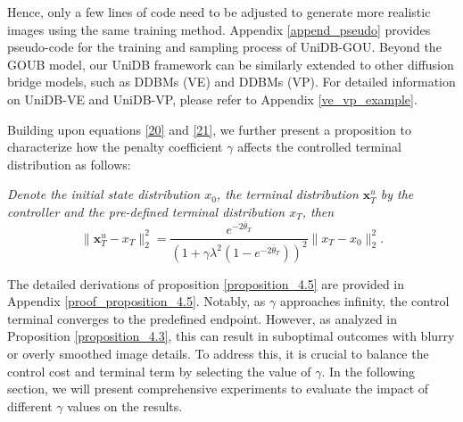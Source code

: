 Hence, only a few lines of code need to be adjusted to generate more realistic images using the same training method. Appendix \ref{append_pseudo} provides pseudo-code for the training and sampling process of UniDB-GOU. Beyond the GOUB model, our UniDB framework can be similarly extended to other diffusion bridge models, such as DDBMs (VE) and DDBMs (VP). For detailed information on UniDB-VE and UniDB-VP, please refer to Appendix \ref{ve_vp_example}. 

Building upon equations \eqref{20} and \eqref{21}, we further present a proposition to characterize how the penalty coefficient $\gamma$ affects the controlled terminal distribution as follows: 
\begin{proposition}\label{proposition_4.5}
\textit{Denote the initial state distribution $x_0$, the terminal distribution $\mathbf{x}_T^u$ by the controller and the pre-defined terminal distribution $x_T$, then}
\begin{equation}\label{terminal_distance}
    \| \mathbf{x}_T^u - x_T \|^2_2 = \frac{e^{-2\bar{\theta}_{T}}}{\left( 1 + \gamma \lambda^2 (1 - e^{-2\bar{\theta}_{T}}) \right)^2} \| x_T - x_0 \|^2_2.
\end{equation}
\end{proposition}


The detailed derivations of proposition \ref{proposition_4.5} are provided in Appendix \ref{proof_proposition_4.5}. Notably, as $\gamma$ approaches infinity, the control terminal converges to the predefined endpoint. However, as analyzed in Proposition \ref{proposition_4.3}, this can result in suboptimal outcomes with blurry or overly smoothed image details. To address this, it is crucial to balance the control cost and terminal term by selecting the value of $\gamma$. In the following section, we will present comprehensive experiments to evaluate the impact of different $\gamma$ values on the results. 